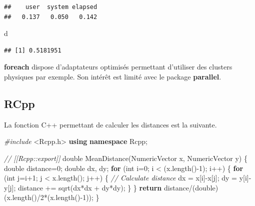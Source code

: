 \documentclass[
  12pt,
  french,
  a4paper,
  extrafontsizes,onecolumn,openright
  ]{memoir}
\newenvironment{Shaded}{\begin{snugshade}}{\end{snugshade}}
\newcommand{\CommentTok}[1]{\textcolor[rgb]{0.56,0.35,0.01}{\textit{#1}}}
\newcommand{\ControlFlowTok}[1]{\textcolor[rgb]{0.13,0.29,0.53}{\textbf{#1}}}
\newcommand{\DataTypeTok}[1]{\textcolor[rgb]{0.13,0.29,0.53}{#1}}
\newcommand{\DecValTok}[1]{\textcolor[rgb]{0.00,0.00,0.81}{#1}}
\newcommand{\ImportTok}[1]{#1}
\newcommand{\KeywordTok}[1]{\textcolor[rgb]{0.13,0.29,0.53}{\textbf{#1}}}
\newcommand{\NormalTok}[1]{#1}
\newcommand{\PreprocessorTok}[1]{\textcolor[rgb]{0.56,0.35,0.01}{\textit{#1}}}
\begin{document}
\begin{verbatim}
##    user  system elapsed 
##   0.137   0.050   0.142
\end{verbatim}

\begin{Shaded}
\begin{Highlighting}[]
\NormalTok{d}
\end{Highlighting}
\end{Shaded}

\begin{verbatim}
## [1] 0.5181951
\end{verbatim}

\normalsize

\textbf{foreach} dispose d'adaptateurs optimisés permettant d'utiliser des clusters physiques par exemple.
Son intérêt est limité avec le package \textbf{parallel}.

\hypertarget{rcpp}{%
\subsection{RCpp}\label{rcpp}}

La fonction C++ permettant de calculer les distances est la suivante.

\scriptsize

\begin{Shaded}
\begin{Highlighting}[]
\PreprocessorTok{#include }\ImportTok{<Rcpp.h>}
\KeywordTok{using} \KeywordTok{namespace}\NormalTok{ Rcpp;}

\CommentTok{// [[Rcpp::export]]}
\DataTypeTok{double}\NormalTok{ MeanDistance(NumericVector x, NumericVector y) \{}
  \DataTypeTok{double}\NormalTok{ distance=}\DecValTok{0}\NormalTok{;}
  \DataTypeTok{double}\NormalTok{ dx, dy;}
  \ControlFlowTok{for}\NormalTok{ (}\DataTypeTok{int}\NormalTok{ i=}\DecValTok{0}\NormalTok{; i < (x.length()-}\DecValTok{1}\NormalTok{); i++) \{}
    \ControlFlowTok{for}\NormalTok{ (}\DataTypeTok{int}\NormalTok{ j=i+}\DecValTok{1}\NormalTok{; j < x.length(); j++) \{}
    \CommentTok{// Calculate distance}
\NormalTok{        dx = x[i]-x[j];}
\NormalTok{        dy = y[i]-y[j];}
\NormalTok{        distance += sqrt(dx*dx + dy*dy);}
\NormalTok{    \}}
\NormalTok{  \}}
  \ControlFlowTok{return}\NormalTok{ distance/(}\DataTypeTok{double}\NormalTok{)(x.length()/}\DecValTok{2}\NormalTok{*(x.length()-}\DecValTok{1}\NormalTok{));}
\NormalTok{\}}
\end{Highlighting}
\end{Shaded}
\end{document}
